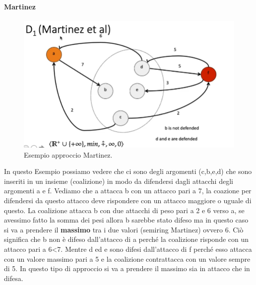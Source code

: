 \paragraph{Martinez}
\begin{figure}[H]
    \centering
    \includegraphics[width=14cm, keepaspectratio]{img/d1_martinez.png}
    \caption{Esempio approccio Martinez.}\label{fig:d1_martinez}
\end{figure}
In questo Esempio possiamo vedere che ci sono degli argomenti (c,b,e,d) che sono inseriti in un insieme (coalizione) in modo da difendersi dagli attacchi degli argomenti a e f. Vediamo che a attacca b con un attacco pari a 7, la coazione per difendersi da questo attacco deve rispondere con un attacco maggiore o uguale di questo. La coalizione attacca b con due attacchi di peso pari a 2 e 6 verso a, se avessimo fatto la somma dei pesi allora b sarebbe stato difeso ma in questo caso si va a prendere il \textbf{massimo} tra i due valori (semiring Martinez) ovvero 6. Ciò significa che b non è difeso dall'attacco di a perché la coalizione risponde con un attacco pari a 6<7.  Mentre d ed e sono difesi dall'attacco di f perché esso attacca con un valore massimo pari a 5 e la coalizione contrattacca con un valore sempre di 5. In questo tipo di approccio si va a prendere il massimo sia in attacco che in difesa.

